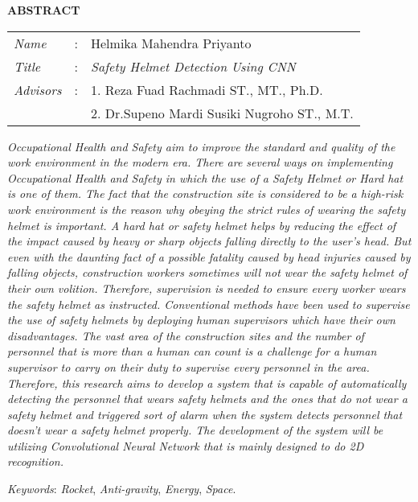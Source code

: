 \begin{center}
  \large\textbf{ABSTRACT}
\end{center}


\vspace{2ex}

\begingroup
  \setlength{\tabcolsep}{0pt}

  \noindent
  \begin{tabularx}{\textwidth}{l >{\centering}m{3em} X}
    \emph{Name}     &:& Helmika Mahendra Priyanto \\

    \emph{Title}    &:& \emph{Safety Helmet Detection Using CNN} \\

    \emph{Advisors} &:& 1. Reza Fuad Rachmadi ST., MT., Ph.D. \\
                    & & 2. Dr.Supeno Mardi Susiki Nugroho ST., M.T. \\
  \end{tabularx}
\endgroup

\emph{
  Occupational Health and Safety aim to improve the standard and quality of the work environment in the modern era. There are several ways on implementing Occupational Health and Safety in which the use of a Safety Helmet or Hard hat is one of them. The fact that the construction site is considered to be a high-risk work environment is the reason why obeying the strict rules of wearing the safety helmet is important. A hard hat or safety helmet helps by reducing the effect of the impact caused by heavy or sharp objects falling directly to the user’s head. But even with the daunting fact of a possible fatality caused by head injuries caused by falling objects, construction workers sometimes will not wear the safety helmet of their own volition. Therefore, supervision is needed to ensure every worker wears the safety helmet as instructed. Conventional methods have been used to supervise the use of safety helmets by deploying human supervisors which have their own disadvantages. The vast area of the construction sites and the number of personnel that is more than a human can count is a challenge for a human supervisor to carry on their duty to supervise every personnel in the area. Therefore, this research aims to develop a system that is capable of automatically detecting the personnel that wears safety helmets and the ones that do not wear a safety helmet and triggered sort of alarm when the system detects personnel that doesn’t wear a safety helmet properly. The development of the system will be utilizing Convolutional Neural Network that is mainly designed to do 2D recognition. 
  }

\emph{Keywords}: \emph{Rocket}, \emph{Anti-gravity}, \emph{Energy}, \emph{Space}.
